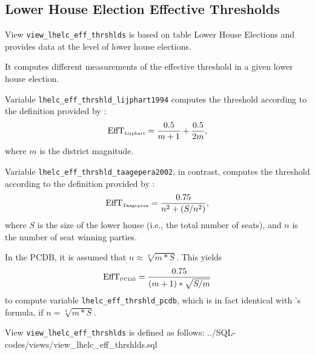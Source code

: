 \subsection{Lower House Election Effective Thresholds}\label{view_lhelc_eff_thrshlds}
View \texttt{view\_lhelc\_eff\_thrshlds} is based on table Lower House Elections and provides data at the level of lower house elections.

It computes different measurements of the effective threshold in a given lower house election.

Variable \texttt{lhelc\_eff\_thrshld\_lijphart1994} computes the threshold according to the definition provided by \citet{Lijphart1994}: 
\begin{equation}\label{EffT_Lijphart_equation}
\mbox{EffT}_{\mbox{\tiny Lijphart}}=\frac{0.5}{m+1}+\frac{0.5}{2m},
\end{equation} 
where $m$ is the district magnitude.

Variable \texttt{lhelc\_eff\_thrshld\_taagepera2002}, in contrast, computes the threshold according to the definition provided by \citet[p.\,309]{Taagepera2002}: 
\begin{equation}\label{EffT_Taagepera_equation}
\mbox{EffT}_{\mbox{\tiny Taagepera}}=\frac{0.75}{n^{2}+(S/n^{2})},
\end{equation}
where $S$ is the size of the lower house (i.e., the total number of seats), and $n$ is the number of seat winning parties.

In the PCDB, it is assumed that $n \approx \sqrt[4]{m*S}$. 
This yields
\begin{equation}\label{EffT_PCDB_equation}
\mbox{EffT}_{\mbox{\tiny PCDB}}=\frac{0.75}{(m+1)*\sqrt{S/m}}
\end{equation} to compute variable \texttt{lhelc\_eff\_thrshld\_pcdb}, which is in fact identical with \citeauthor{Taagepera2002}'s formula, if $n = \sqrt[4]{m*S}$.


View \texttt{view\_lhelc\_eff\_thrshlds} is defined as follows:
%
{../SQL-codes/views/view_lhelc_eff_thrshlds.sql}
